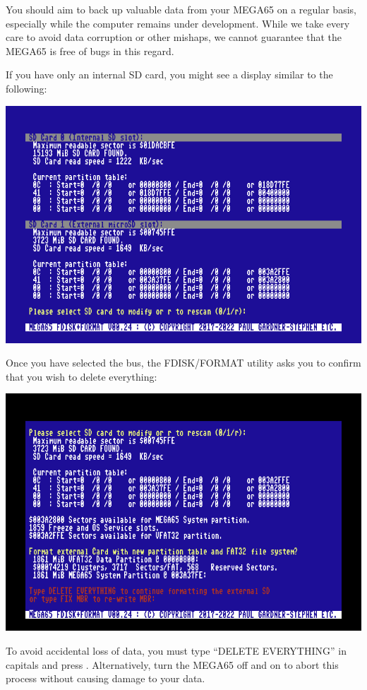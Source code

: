 You should aim to back up valuable data from your
MEGA65 on a regular basis, especially while the computer remains under
development.  While we take every care to avoid data corruption or
other mishaps, we cannot guarantee that the MEGA65 is free of bugs in
this regard.

If you have only an internal SD card, you might see a
display similar to the following:

\includegraphics[width=\linewidth]{images/ss-m65fdisk-busselect.png}

Once you have selected the bus, the FDISK/FORMAT utility asks you to confirm that you wish to delete everything:

\includegraphics[width=\linewidth]{images/ss-m65fdisk-typesomething.png}

To avoid accidental loss of data, you must type ``DELETE EVERYTHING'' in capitals and press . Alternatively, turn the MEGA65 off and on to abort this process without causing damage to your data.

